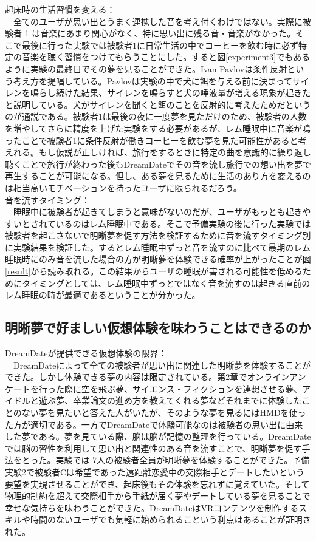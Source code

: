 起床時の生活習慣を変える：\\
　全てのユーザが思い出とうまく連携した音を考え付くわけではない。実際に被験者 1 は音楽にあまり関心がなく、特に思い出に残る音・音楽がなかった。そこで最後に行った実験では被験者1に日常生活の中でコーヒーを飲む時に必ず特定の音楽を聴く習慣をつけてもらうことにした。すると図\ref{experiment3}でもあるように実験の最終日でその夢を見ることができた。Ivan Pavlovは条件反射という考え方を提唱している\cite{pavlov}。Pavlovは実験の中で犬に餌を与える前に決まってサイレンを鳴らし続けた結果、サイレンを鳴らすと犬の唾液量が増える現象が起きたと説明している。犬がサイレンを聞くと餌のことを反射的に考えたためだというのが通説である。被験者1は最後の夜に一度夢を見ただけのため、被験者の人数を増やしてさらに精度を上げた実験をする必要があるが、レム睡眠中に音楽が鳴ったことで被験者1に条件反射が働きコーヒーを飲む夢を見た可能性があると考えれる。もし仮説が正しければ、旅行をするときに特定の曲を意識的に繰り返し聴くことで旅行が終わった後もDreamDateでその音を流し旅行での想い出を夢で再生することが可能になる。但し、ある夢を見るために生活のあり方を変えるのは相当高いモチベーションを持ったユーザに限られるだろう。\\

音を流すタイミング：\\
　睡眠中に被験者が起きてしまうと意味がないのだが、ユーザがもっとも起きやすいとされているのはレム睡眠中である\cite{レムノンレム}。そこで予備実験の後に行った実験では被験者を起こさないで明晰夢を促す方法を検証するために音を流すタイミング別に実験結果を検証した。するとレム睡眠中ずっと音を流すのに比べて最期のレム睡眠時にのみ音を流した場合の方が明晰夢を体験できる確率が上がったことが図\ref{result}から読み取れる。この結果からユーザの睡眠が害される可能性を低めるためにタイミングとしては、レム睡眠中ずっとではなく音を流すのは起きる直前のレム睡眠の時が最適であるということが分かった。

\subsection{明晰夢で好ましい仮想体験を味わうことはできるのか} 
DreamDateが提供できる仮想体験の限界：\\
　DreamDateによって全ての被験者が思い出に関連した明晰夢を体験することができた。しかし体験できる夢の内容は限定されている。第2章でオンラインアンケートを行った際に空を飛ぶ夢、サイエンス・フィクションを連想させる夢、アイドルと遊ぶ夢、卒業論文の進め方を教えてくれる夢などそれまでに体験したことのない夢を見たいと答えた人がいたが、そのような夢を見るにはHMDを使った方が適切である。一方でDreamDateで体験可能なのは被験者の思い出に由来した夢である。夢を見ている際、脳は脳が記憶の整理を行っている\cite{Zhang}。DreamDateでは脳の習性を利用して思い出と関連性のある音を流すことで、明晰夢を促す手法をとった。実験では 7人の被験者全員が明晰夢を体験することができた。予備実験2で被験者Cは希望であった遠距離恋愛中の交際相手とデートしたいという要望を実現させることができ、起床後もその体験を忘れずに覚えていた。そして物理的制約を超えて交際相手から手紙が届く夢やデートしている夢を見ることで幸せな気持ちを味わうことができた。DreamDateはVRコンテンツを制作するスキルや時間のないユーザでも気軽に始められるこという利点はあることが証明された。

